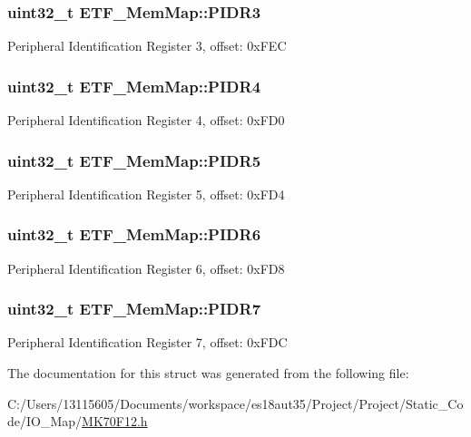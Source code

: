 \subsubsection[{P\+I\+D\+R3}]{\setlength{\rightskip}{0pt plus 5cm}uint32\+\_\+t E\+T\+F\+\_\+\+Mem\+Map\+::\+P\+I\+D\+R3}\label{struct_e_t_f___mem_map_a1132bf279f207a39e89f2fab3d384308}
Peripheral Identification Register 3, offset\+: 0x\+F\+E\+C \hypertarget{struct_e_t_f___mem_map_a955a81d9c5e73e129ca965fa226bfde8}{}
\subsubsection[{P\+I\+D\+R4}]{\setlength{\rightskip}{0pt plus 5cm}uint32\+\_\+t E\+T\+F\+\_\+\+Mem\+Map\+::\+P\+I\+D\+R4}\label{struct_e_t_f___mem_map_a955a81d9c5e73e129ca965fa226bfde8}
Peripheral Identification Register 4, offset\+: 0x\+F\+D0 \hypertarget{struct_e_t_f___mem_map_a3054ae260a217f950e2c7793ff27855d}{}
\subsubsection[{P\+I\+D\+R5}]{\setlength{\rightskip}{0pt plus 5cm}uint32\+\_\+t E\+T\+F\+\_\+\+Mem\+Map\+::\+P\+I\+D\+R5}\label{struct_e_t_f___mem_map_a3054ae260a217f950e2c7793ff27855d}
Peripheral Identification Register 5, offset\+: 0x\+F\+D4 \hypertarget{struct_e_t_f___mem_map_a3448111767c72273ead546c08f49047b}{}
\subsubsection[{P\+I\+D\+R6}]{\setlength{\rightskip}{0pt plus 5cm}uint32\+\_\+t E\+T\+F\+\_\+\+Mem\+Map\+::\+P\+I\+D\+R6}\label{struct_e_t_f___mem_map_a3448111767c72273ead546c08f49047b}
Peripheral Identification Register 6, offset\+: 0x\+F\+D8 \hypertarget{struct_e_t_f___mem_map_a53393d8ce48a43bed1d5568561776a5c}{}
\subsubsection[{P\+I\+D\+R7}]{\setlength{\rightskip}{0pt plus 5cm}uint32\+\_\+t E\+T\+F\+\_\+\+Mem\+Map\+::\+P\+I\+D\+R7}\label{struct_e_t_f___mem_map_a53393d8ce48a43bed1d5568561776a5c}
Peripheral Identification Register 7, offset\+: 0x\+F\+D\+C 

The documentation for this struct was generated from the following file\+:\begin{DoxyCompactItemize}
\item 
C\+:/\+Users/13115605/\+Documents/workspace/es18aut35/\+Project/\+Project/\+Static\+\_\+\+Code/\+I\+O\+\_\+\+Map/\hyperlink{_m_k70_f12_8h}{M\+K70\+F12.\+h}\end{DoxyCompactItemize}
